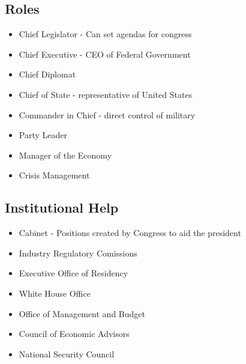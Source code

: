 \documentclass{article}
\begin{document}
\subsection{Roles}
\begin{itemize}
  \item Chief Legislator - Can set agendas for congress
  \item Chief Executive - CEO of Federal Government
  \item Chief Diplomat
  \item Chief of State - representative of United States
  \item Commander in Chief - direct control of military
  \item Party Leader
  \item Manager of the Economy
  \item Crisis Management
\end{itemize}

\subsection{Institutional Help}
\begin{itemize}
  \item Cabinet - Positions created by Congress to aid the president
  \item Industry Regulatory Comissions
  \item Executive Office of Residency
  \item White House Office
  \item Office of Management and Budget
  \item Council of Economic Advisors
  \item National Security Council
\end{itemize}
\end{document}
